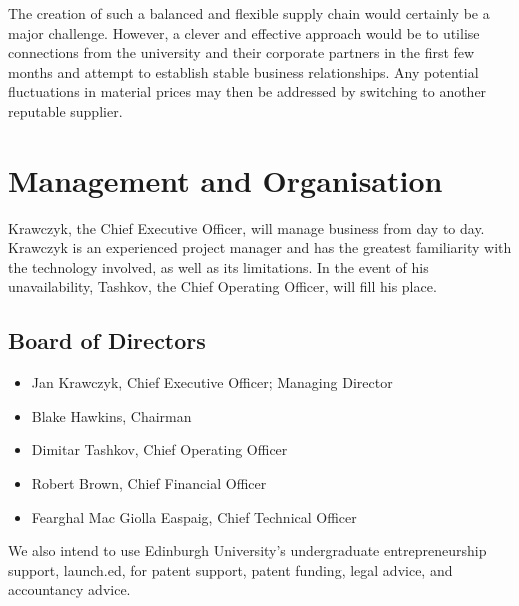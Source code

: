 \documentclass[a4paper,11pt]{article}
\begin{document}
The creation of such a balanced and flexible supply chain would certainly be a major challenge. However, a clever and effective approach would be to utilise connections from the university and their corporate partners in the first few months and attempt to establish stable business relationships. Any potential fluctuations in material prices may then be addressed by switching to another reputable supplier.

\pagebreak

\section{Management and Organisation}
Krawczyk, the Chief Executive Officer, will manage business from day to day. Krawczyk is an experienced project manager and has the greatest familiarity with the technology involved, as well as its limitations. In the event of his unavailability, Tashkov, the Chief Operating Officer, will fill his place.

\subsection{Board of Directors}
\begin{itemize}
	\item Jan Krawczyk, Chief Executive Officer; Managing Director
	\item Blake Hawkins, Chairman
	\item Dimitar Tashkov, Chief Operating Officer
	\item Robert Brown, Chief Financial Officer
	\item Fearghal Mac Giolla Easpaig, Chief Technical Officer
\end{itemize}

We also intend to use Edinburgh University's undergraduate entrepreneurship support, launch.ed, for patent support, patent funding, legal advice, and accountancy advice.

\pagebreak
\end{document}
